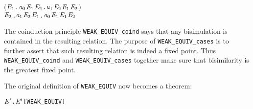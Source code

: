 \begin{itemize}
\begin{alltt}
   \ensuremath{(}\HOLSymConst{\HOLTokenForall{}}\ensuremath{\HOLBoundVar{E}\sb{\mathrm{1}}}. \ensuremath{\HOLFreeVar{a}\sb{\mathrm{0}}} \HOLTokenTransBegin\HOLSymConst{\ensuremath{\tau}}\HOLTokenTransEnd \ensuremath{\HOLBoundVar{E}\sb{\mathrm{1}}} \HOLSymConst{\HOLTokenImp{}} \HOLSymConst{\HOLTokenExists{}}\ensuremath{\HOLBoundVar{E}\sb{\mathrm{2}}}. \ensuremath{\HOLFreeVar{a}\sb{\mathrm{1}}} \HOLSymConst{\HOLTokenEPS} \ensuremath{\HOLBoundVar{E}\sb{\mathrm{2}}} \HOLSymConst{\HOLTokenConj{}} \ensuremath{\HOLBoundVar{E}\sb{\mathrm{1}}} \HOLSymConst{\HOLTokenWeakEQ} \ensuremath{\HOLBoundVar{E}\sb{\mathrm{2}}}\ensuremath{)} \HOLSymConst{\HOLTokenConj{}}
   \HOLSymConst{\HOLTokenForall{}}\ensuremath{\HOLBoundVar{E}\sb{\mathrm{2}}}. \ensuremath{\HOLFreeVar{a}\sb{\mathrm{1}}} \HOLTokenTransBegin\HOLSymConst{\ensuremath{\tau}}\HOLTokenTransEnd \ensuremath{\HOLBoundVar{E}\sb{\mathrm{2}}} \HOLSymConst{\HOLTokenImp{}} \HOLSymConst{\HOLTokenExists{}}\ensuremath{\HOLBoundVar{E}\sb{\mathrm{1}}}. \ensuremath{\HOLFreeVar{a}\sb{\mathrm{0}}} \HOLSymConst{\HOLTokenEPS} \ensuremath{\HOLBoundVar{E}\sb{\mathrm{1}}} \HOLSymConst{\HOLTokenConj{}} \ensuremath{\HOLBoundVar{E}\sb{\mathrm{1}}} \HOLSymConst{\HOLTokenWeakEQ} \ensuremath{\HOLBoundVar{E}\sb{\mathrm{2}}}
\end{alltt}
\end{itemize}

The coinduction principle \texttt{WEAK_EQUIV_coind} says that any
bisimulation is contained in the resulting relation.
The purpose of \texttt{WEAK_EQUIV_cases} is to
further assert that such resulting relation is indeed a
fixed point. Thus \texttt{WEAK_EQUIV_coind} and \texttt{WEAK_EQUIV_cases}
together make sure that bisimilarity is the greatest fixed point.

The original definition of \texttt{WEAK_EQUIV} now becomes a theorem:
\begin{alltt}
\HOLTokenTurnstile{}  \HOLSymConst{\HOLTokenWeakEQ} \ensuremath{\HOLFreeVar{E}\sp{\prime}} \HOLSymConst{\HOLTokenEquiv{}} \HOLSymConst{\HOLTokenExists{}}.   \ensuremath{\HOLFreeVar{E}\sp{\prime}} \HOLSymConst{\HOLTokenConj{}}  \hfill{[WEAK_EQUIV]}
\end{alltt}

